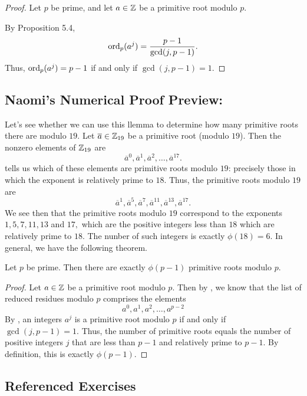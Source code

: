 \documentclass[letterpaper, 11 pt]{ximera}
\theoremstyle{definition}
\begin{document}
\begin{proof}
    Let $p$ be prime, and let $a\in\mathbb Z$ be a primitive root modulo $p.$

    By Proposition 5.4, 
    \[\operatorname{ord}_p(a^j)=\frac{p-1}{\gcd(j,p-1)}.\]
    Thus, 
    $\operatorname{ord}_p(a^j)=p-1$ if and only if $\gcd(j,p-1)=1.$
\end{proof}

\subsection*{Naomi's Numerical Proof Preview: }
Let's see whether we can use this llemma to determine how many primitive roots there are modulo $19.$ Let $\overline{a}\in\mathbb Z_{19}$ be a primitive root (modulo $19$). Then the nonzero elements of $\mathbb Z_{19}$ are 
\[\overline{a}^0,\overline{a}^1,\overline{a}^2,\dots,\overline{a}^{17}.\]
 tells us which of these elements are primitive roots modulo $19$: precisely those in which the exponent is relatively prime to $18.$ Thus, the primitive roots modulo $19$ are 
\[\overline{a}^1,\overline{a}^5,\overline{a}^7,\overline{a}^{11},\overline{a}^{13},\overline{a}^{17}.\]
We see then that the primitive roots modulo $19$ correspond to the exponents $1,5,7,11,13$ and $17,$ which are the positive integers less than $18$ which are relatively prime to $18.$ The nunber of such integers is exactly $\phi(18)=6.$ In general, we have the following theorem.

\begin{thm*}[Theorem 10.3.7]\label{read-thm:number-prime-roots}
    Let $p$ be prime. Then there are exactly $\phi(p-1)$ primitive roots modulo $p.$
\end{thm*}

\begin{proof}
    Let $a\in\mathbb Z$ be a primitive root modulo $p.$ Then by , we know that the list of reduced residues modulo $p$ comprises the elements 
    \[a^0,a^1,a^2,\dots,a^{p-2}\]
    By , an integers $a^j$ is a primitive root modulo $p$ if and only if $\gcd(j,p-1)=1.$ Thus, the number of primitive roots equals the number of positive integers $j$ that are less than $p-1$ and relatively prime to $p-1.$ By definition, this is exactly $\phi(p-1).$
\end{proof}


\subsection*{Referenced Exercises}
\end{document}
